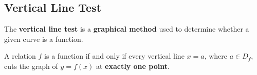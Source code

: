 \documentclass[11pt,a4paper]{book}
\begin{document}
\newpage


\subsection{Vertical Line Test}
The \textbf{vertical line test} is a \textbf{graphical method} used to determine whether a given curve is a function.

\medskip{}

\begin{tcolorbox}[colback=blue!5, colframe=black,boxrule=.4pt, sharpish corners]

A relation $f$ is a function if and only if every vertical line $x=a$, where $a\in D_{f}$, cuts the graph of $y=f(x)$ at \textbf{exactly one point}.

\end{tcolorbox}
\end{document}
